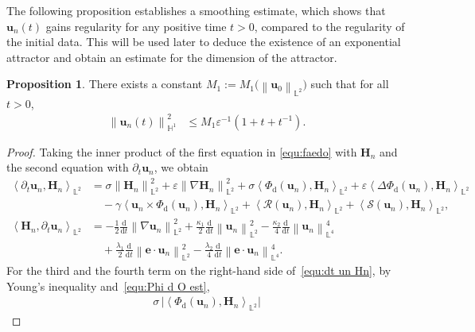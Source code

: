 \documentclass[11pt, reqno]{amsart}
\theoremstyle{definition}
\newtheorem{proposition}[theorem]{Proposition}
\numberwithin{equation}{section}
\newcommand{\bff}{\boldsymbol}
\newcommand{\bb}{\mathbb}
\newcommand{\ddt}{\frac{\mathrm{d}}{\mathrm{d}t}}
\newcommand{\norm}[2]{\left\|{#1}\right\|_{#2}}
\newcommand{\inpro}[2]{\left\langle#1,#2\right\rangle}
\begin{document}
The following proposition establishes a smoothing estimate, which shows that $\bff{u}_n(t)$ gains regularity for any positive time $t>0$, compared to the regularity of the initial data. This will be used later to deduce the existence of an exponential attractor and obtain an estimate for the dimension of the attractor. 

\begin{proposition}\label{pro:H1 smooth}
There exists a constant $M_1:=M_1\big(\norm{\bff{u}_0}{\bb{L}^2}\big)$ such that for all $t> 0$,
\begin{align*}
	\norm{\bff{u}_n(t)}{\bb{H}^1}^2
	&\leq
	M_1 \varepsilon^{-1} (1+t+t^{-1}).
\end{align*}
\end{proposition}

\begin{proof}
Taking the inner product of the first equation in \eqref{equ:faedo} with $\bff{H}_n$ and the second equation with $\partial_t \bff{u}_n$, we obtain
	\begin{align}
    \label{equ:dt un Hn}
		\inpro{\partial_t \bff{u}_n}{\bff{H}_n}_{\bb{L}^2}
		&=
		\sigma \norm{\bff{H}_n}{\bb{L}^2}^2
		+
		\varepsilon \norm{\nabla \bff{H}_n}{\bb{L}^2}^2
        +
		\sigma \inpro{\Phi_{\mathrm{d}}(\bff{u}_n)}{\bff{H}_n}_{\bb{L}^2}
		+
		\varepsilon \inpro{\Delta \Phi_{\mathrm{d}}(\bff{u}_n)}{\bff{H}_n}_{\bb{L}^2}
        \nonumber \\
        &\quad
        -
        \gamma \inpro{\bff{u}_n \times \Phi_{\mathrm{d}}(\bff{u}_n)}{\bff{H}_n}_{\bb{L}^2}
		+
		\inpro{\mathcal{R}(\bff{u}_n)}{\bff{H}_n}_{\bb{L}^2}
		+
		\inpro{\mathcal{S}(\bff{u}_n)}{\bff{H}_n}_{\bb{L}^2},
		\\
    \label{equ:Hn dt un}
		\inpro{\bff{H}_n}{\partial_t \bff{u}_n}_{\bb{L}^2}
		&=
		-
		\frac{1}{2} \ddt \norm{\nabla \bff{u}_n}{\bb{L}^2}^2
		+
		\frac{\kappa_1}{2} \ddt \norm{\bff{u}_n}{\bb{L}^2}^2
		-
		\frac{\kappa_2}{4} \ddt \norm{\bff{u}_n}{\bb{L}^4}^4
        \nonumber\\
        &\quad
        +
        \frac{\lambda_1}{2} \ddt \norm{\bff{e}\cdot \bff{u}_n}{\bb{L}^2}^2
        -
        \frac{\lambda_2}{4} \ddt \norm{\bff{e}\cdot \bff{u}_n}{\bb{L}^4}^4.
	\end{align}
    For the third and the fourth term on the right-hand side of~\eqref{equ:dt un Hn}, by Young's inequality and~\eqref{equ:Phi d O est},
    \begin{align*}
        \sigma\,\Big|\inpro{\Phi_{\mathrm{d}}(\bff{u}_n)}{\bff{H}_n}_{\bb{L}^2} \Big|

\end{align*}
\end{proof}
\end{document}
